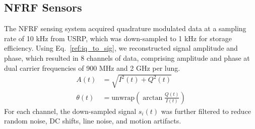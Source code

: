 \documentclass[journal,twoside,web]{ieeecolor}
\begin{document}
\subsection{NFRF Sensors}
The NFRF sensing system acquired quadrature modulated data at a sampling rate of 10 kHz from USRP, which was down-sampled to 1 kHz for storage efficiency. Using Eq.~\ref{ref:iq_to_sig}, we reconstructed signal amplitude and phase, which resulted in 8 channels of data, comprising amplitude and phase at dual carrier frequencies of 900 MHz and 2 GHz per lung. 
\begin{equation}
    \begin{split}
        A(t) &= \sqrt{I^2(t) + Q^2(t)} \\
        \theta (t) &= \text{unwrap}(\arctan \frac{Q(t)}{I(t)})
    \end{split}
    \label{ref:iq_to_sig}    
\end{equation}
For each channel, the down-sampled signal $s_{i}(t)$ was further filtered to reduce random noise, DC shifts, line noise, and motion artifacts. 
\end{document}
